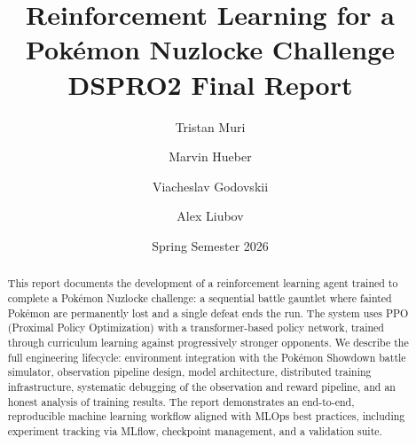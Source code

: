 \documentclass[11pt,a4paper]{report}
\title{Reinforcement Learning for a Pok\'{e}mon Nuzlocke Challenge\\[0.3em]
\large DSPRO2 Final Report}
\author{Tristan Muri \and Marvin Hueber \and Viacheslav Godovskii \and Alex Liubov}
\date{Spring Semester 2026}
\begin{document}
\maketitle

\begin{abstract}
This report documents the development of a reinforcement learning agent trained to complete a
Pok\'{e}mon Nuzlocke challenge: a sequential battle gauntlet where fainted Pok\'{e}mon are
permanently lost and a single defeat ends the run.  The system uses PPO (Proximal Policy
Optimization) with a transformer-based policy network, trained through curriculum learning against
progressively stronger opponents.  We describe the full engineering lifecycle: environment
integration with the Pok\'{e}mon Showdown battle simulator, observation pipeline design,
model architecture, distributed training infrastructure, systematic debugging of the observation
and reward pipeline, and an honest analysis of training results.  The report demonstrates an
end-to-end, reproducible machine learning workflow aligned with MLOps best practices, including
experiment tracking via MLflow, checkpoint management, and a validation suite.
\end{abstract}

\tableofcontents
\newpage













\appendix

\end{document}
